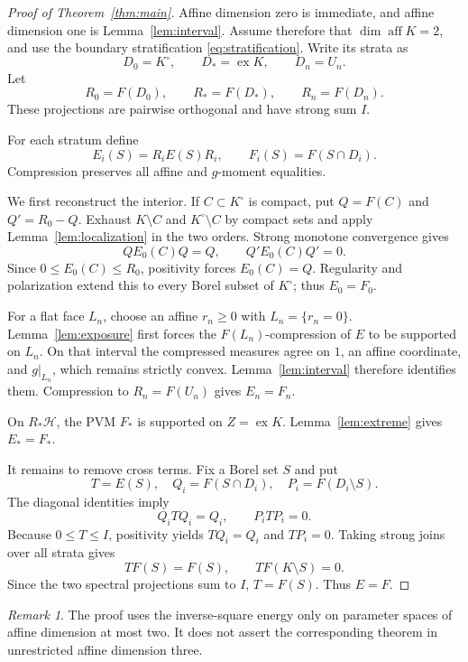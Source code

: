 \documentclass[11pt,a4paper]{amsart}
\theoremstyle{remark}
\newtheorem{remark}[theorem]{Remark}
\newcommand{\aff}{\operatorname{aff}}
\newcommand{\ex}{\operatorname{ex}}
\newcommand{\calH}{\mathcal H}
\begin{document}
\begin{proof}[Proof of Theorem~\ref{thm:main}]
Affine dimension zero is immediate, and affine dimension one is
Lemma~\ref{lem:interval}.  Assume therefore that \(\dim\aff K=2\), and use
the boundary stratification \eqref{eq:stratification}.  Write its strata as
\[
 D_0=K^\circ,\qquad D_*=\ex K,\qquad D_n=U_n.
\]
Let
\[
 R_0=F(D_0),\qquad R_*=F(D_*),\qquad R_n=F(D_n).
\]
These projections are pairwise orthogonal and have strong sum \(I\).

For each stratum define
\[
 E_i(S)=R_iE(S)R_i,\qquad F_i(S)=F(S\cap D_i).
\]
Compression preserves all affine and \(g\)-moment equalities.

We first reconstruct the interior.  If \(C\subset K^\circ\) is compact, put
\(Q=F(C)\) and \(Q'=R_0-Q\).  Exhaust \(K\setminus C\) and
\(K^\circ\setminus C\) by compact sets and apply
Lemma~\ref{lem:localization} in the two orders.  Strong monotone convergence
gives
\[
 QE_0(C)Q=Q,\qquad Q'E_0(C)Q'=0.
\]
Since \(0\leq E_0(C)\leq R_0\), positivity forces \(E_0(C)=Q\).
Regularity and polarization extend this to every Borel subset of \(K^\circ\);
thus \(E_0=F_0\).

For a flat face \(L_n\), choose an affine \(r_n\geq0\) with
\(L_n=\{r_n=0\}\).  Lemma~\ref{lem:exposure} first forces the
\(F(L_n)\)-compression of \(E\) to be supported on \(L_n\).  On that interval
the compressed measures agree on \(1\), an affine coordinate, and
\(g|_{L_n}\), which remains strictly convex.  Lemma~\ref{lem:interval}
therefore identifies them.  Compression to \(R_n=F(U_n)\) gives
\(E_n=F_n\).

On \(R_*\calH\), the PVM \(F_*\) is supported on \(Z=\ex K\).
Lemma~\ref{lem:extreme} gives \(E_*=F_*\).

It remains to remove cross terms.  Fix a Borel set \(S\) and put
\[
 T=E(S),\quad Q_i=F(S\cap D_i),\quad
 P_i=F(D_i\setminus S).
\]
The diagonal identities imply
\[
 Q_iTQ_i=Q_i,\qquad P_iTP_i=0.
\]
Because \(0\leq T\leq I\), positivity yields \(TQ_i=Q_i\) and \(TP_i=0\).
Taking strong joins over all strata gives
\[
 TF(S)=F(S),\qquad TF(K\setminus S)=0.
\]
Since the two spectral projections sum to \(I\), \(T=F(S)\).  Thus
\(E=F\).
\end{proof}

\begin{remark}
The proof uses the inverse-square energy only on parameter spaces of affine
dimension at most two.  It does not assert the corresponding theorem in
unrestricted affine dimension three.
\end{remark}
\end{document}
